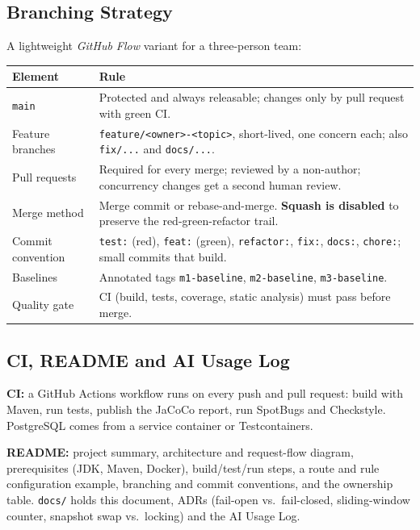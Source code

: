 \documentclass[12pt,a4paper]{article}
\newcommand{\cls}[1]{\nolinkurl{#1}}
\begin{document}
\subsection{Branching Strategy}
A lightweight \emph{GitHub Flow} variant for a three-person team:

\begingroup
\small
\setlength{\tabcolsep}{4pt}
\begin{tabular}{L{3.0cm} L{10.8cm}}
\toprule
\textbf{Element} & \textbf{Rule} \\
\midrule
\cls{main} & Protected and always releasable; changes only by pull request with green CI. \\
Feature branches & \cls{feature/<owner>-<topic>}, short-lived, one concern each; also \cls{fix/...} and \cls{docs/...}. \\
Pull requests & Required for every merge; reviewed by a non-author; concurrency changes get a second human review. \\
Merge method & Merge commit or rebase-and-merge. \textbf{Squash is disabled} to preserve the red-green-refactor trail. \\
Commit convention & \cls{test:} (red), \cls{feat:} (green), \cls{refactor:}, \cls{fix:}, \cls{docs:}, \cls{chore:}; small commits that build. \\
Baselines & Annotated tags \cls{m1-baseline}, \cls{m2-baseline}, \cls{m3-baseline}. \\
Quality gate & CI (build, tests, coverage, static analysis) must pass before merge. \\
\bottomrule
\end{tabular}
\endgroup

\subsection{CI, README and AI Usage Log}
\textbf{CI:} a GitHub Actions workflow runs on every push and pull request: build with Maven, run tests, publish the JaCoCo report, run SpotBugs and Checkstyle. PostgreSQL comes from a service container or Testcontainers.

\textbf{README:} project summary, architecture and request-flow diagram, prerequisites (JDK, Maven, Docker), build/test/run steps, a route and rule configuration example, branching and commit conventions, and the ownership table. \cls{docs/} holds this document, ADRs (fail-open vs.\ fail-closed, sliding-window counter, snapshot swap vs.\ locking) and the AI Usage Log.
\end{document}

